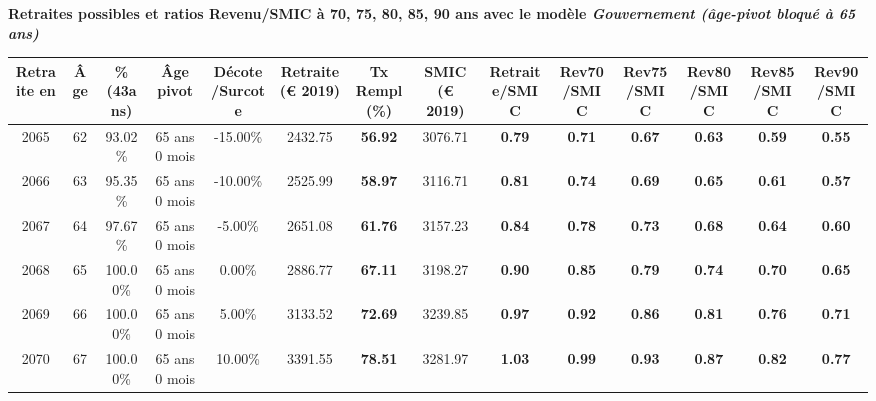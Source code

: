{\bf \noindent Retraites possibles et ratios Revenu/SMIC à 70, 75, 80, 85, 90 ans avec le modèle \emph{Gouvernement (âge-pivot bloqué à 65 ans)}}  
 
\begin{adjustbox}{max width=\textwidth} 
\begin{tabular}[htb]{|c|c||c|c|c||c|c||c||c|c|c|c|c|c|} 
\hline 
 Retraite en &  Âge &  \%(43ans) &  Âge pivot &  Décote/Surcote &  Retraite (\euro{} 2019) &  Tx Rempl(\%) &  SMIC (\euro{} 2019) &  Retraite/SMIC &  Rev70/SMIC &  Rev75/SMIC &  Rev80/SMIC &  Rev85/SMIC &  Rev90/SMIC \\ 
\hline \hline 
 2065 &  62 &  93.02\% &  65 ans 0 mois &  -15.00\% &  2432.75 &  {\bf 56.92} &  3076.71 &  {\bf {\color{red} 0.79}} &  {\bf {\color{red} 0.71}} &  {\bf {\color{red} 0.67}} &  {\bf {\color{red} 0.63}} &  {\bf {\color{red} 0.59}} &  {\bf {\color{red} 0.55}} \\ 
\hline 
 2066 &  63 &  95.35\% &  65 ans 0 mois &  -10.00\% &  2525.99 &  {\bf 58.97} &  3116.71 &  {\bf {\color{red} 0.81}} &  {\bf {\color{red} 0.74}} &  {\bf {\color{red} 0.69}} &  {\bf {\color{red} 0.65}} &  {\bf {\color{red} 0.61}} &  {\bf {\color{red} 0.57}} \\ 
\hline 
 2067 &  64 &  97.67\% &  65 ans 0 mois &  -5.00\% &  2651.08 &  {\bf 61.76} &  3157.23 &  {\bf {\color{red} 0.84}} &  {\bf {\color{red} 0.78}} &  {\bf {\color{red} 0.73}} &  {\bf {\color{red} 0.68}} &  {\bf {\color{red} 0.64}} &  {\bf {\color{red} 0.60}} \\ 
\hline 
 2068 &  65 &  100.00\% &  65 ans 0 mois &  0.00\% &  2886.77 &  {\bf 67.11} &  3198.27 &  {\bf {\color{red} 0.90}} &  {\bf {\color{red} 0.85}} &  {\bf {\color{red} 0.79}} &  {\bf {\color{red} 0.74}} &  {\bf {\color{red} 0.70}} &  {\bf {\color{red} 0.65}} \\ 
\hline 
 2069 &  66 &  100.00\% &  65 ans 0 mois &  5.00\% &  3133.52 &  {\bf 72.69} &  3239.85 &  {\bf {\color{red} 0.97}} &  {\bf {\color{red} 0.92}} &  {\bf {\color{red} 0.86}} &  {\bf {\color{red} 0.81}} &  {\bf {\color{red} 0.76}} &  {\bf {\color{red} 0.71}} \\ 
\hline 
 2070 &  67 &  100.00\% &  65 ans 0 mois &  10.00\% &  3391.55 &  {\bf 78.51} &  3281.97 &  {\bf 1.03} &  {\bf {\color{red} 0.99}} &  {\bf {\color{red} 0.93}} &  {\bf {\color{red} 0.87}} &  {\bf {\color{red} 0.82}} &  {\bf {\color{red} 0.77}} \\ 
\hline 
\hline 
\end{tabular} 
\end{adjustbox} 
 
